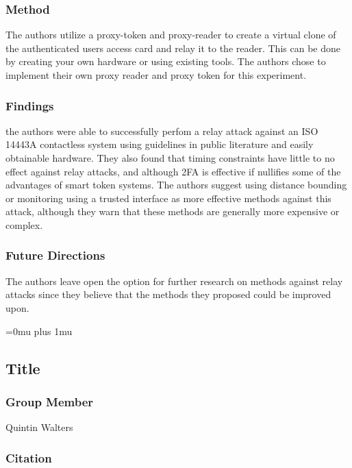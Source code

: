 \subsubsection{Method}

\noindent
The authors utilize a proxy-token and proxy-reader to create a virtual clone of the authenticated users access card and relay it to the reader. This can be done by creating your own hardware or using existing tools. The authors chose to implement their own proxy reader and proxy token for this experiment.

\subsubsection{Findings}

\noindent
the authors were able to successfully perfom a relay attack against an ISO 14443A contactless system using guidelines in public literature and easily obtainable hardware. They also found that timing constraints have little to no effect against relay attacks, and although 2FA is effective if nullifies some of the advantages of smart token systems. The authors suggest using distance bounding or monitoring using a trusted interface as more effective methods against this attack, although they warn that these methods are generally more expensive or complex. 

\subsubsection{Future Directions}

\noindent
The authors leave open the option for further research on methods against relay attacks since they believe that the methods they proposed could be improved upon.

\Urlmuskip=0mu plus 1mu\relax

\noindent
\subsection{Title}

\subsubsection{Group Member}

\noindent
Quintin Walters

\noindent
\subsubsection{Citation}


